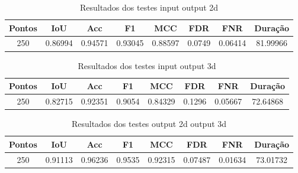 \begin{table}[h]
            \centering
            \caption{Resultados dos testes input output 2d}
            \label{tab:final_input_output_2d}
            \begin{tabular}{|c|c|c|c|c|c|c|c|}
                \hline
                                Pontos & IoU & Acc & F1 & MCC & FDR & FNR & Duração \\
                \hline
                250 & 0.86994 & 0.94571 & 0.93045 & 0.88597 & 0.0749 & 0.06414 & 81.99966\\
                \hline
            \end{tabular}
        \end{table}


\begin{table}[h]
            \centering
            \caption{Resultados dos testes input output 3d}
            \label{tab:final_input_output_3d}
            \begin{tabular}{|c|c|c|c|c|c|c|c|}
                \hline
                                Pontos & IoU & Acc & F1 & MCC & FDR & FNR & Duração \\
                \hline
                250 & 0.82715 & 0.92351 & 0.9054 & 0.84329 & 0.1296 & 0.05667 & 72.64868\\
                \hline
            \end{tabular}
        \end{table}


\begin{table}[h]
            \centering
            \caption{Resultados dos testes output 2d output 3d}
            \label{tab:final_output_2d_output_3d}
            \begin{tabular}{|c|c|c|c|c|c|c|c|}
                \hline
                                Pontos & IoU & Acc & F1 & MCC & FDR & FNR & Duração \\
                \hline
                250 & 0.91113 & 0.96236 & 0.9535 & 0.92315 & 0.07487 & 0.01634 & 73.01732\\
                \hline
            \end{tabular}
        \end{table}


